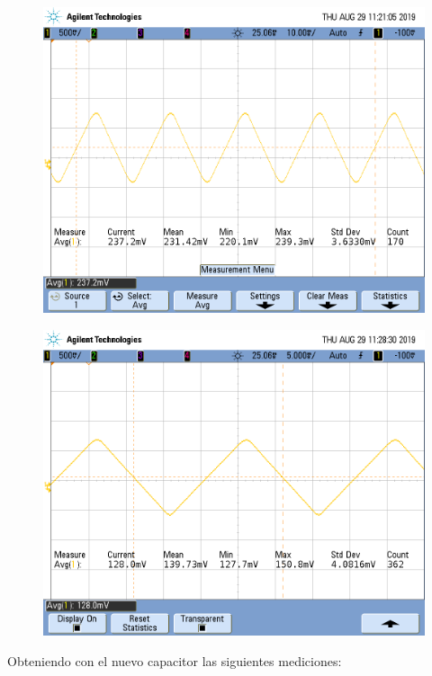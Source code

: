 \begin{figure}[H]
\centering
\begin{minipage}{.5\textwidth}
  \centering
  \includegraphics[width=.99\linewidth]{imagenes/RS2CORTOTL081.png}
  \label{fig:ib+TL}
\end{minipage}%
\begin{minipage}{.5\textwidth}
  \centering
  \includegraphics[width=.99\linewidth]{imagenes/RS1CORTOTL081.png}
  \label{fig:ib-TL}
\end{minipage}
\end{figure}
Obteniendo con el nuevo capacitor las siguientes mediciones:

